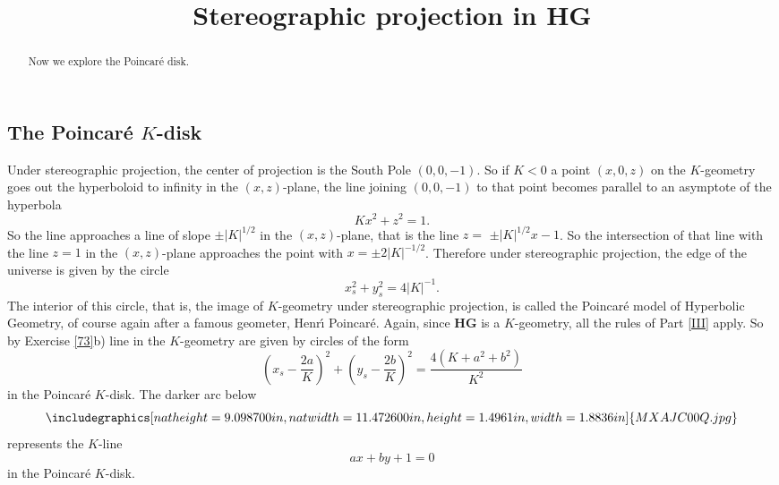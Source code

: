 \documentclass{ximera}
\title{Stereographic projection in HG}
\begin{document}
\begin{abstract}
Now we explore the Poincar\'e disk.
\end{abstract}
\maketitle

\subsection*{The Poincar\'{e} $K$-disk}

Under stereographic projection, the center of projection is the South Pole
$\left(  0,0,-1\right)  $. So if $K<0$ a point $\left(  x,0,z\right)  $ on the
$K$-geometry goes out the hyperboloid to infinity in the $\left(  x,z\right)
$-plane, the line joining $\left(  0,0,-1\right)  $ to that point becomes
parallel to an asymptote of the hyperbola%
\[
Kx^{2}+z^{2}=1.
\]
So the line approaches a line of slope $\pm\left\vert K\right\vert ^{1/2}$ in
the $\left(  x,z\right)  $-plane, that is the line $z=$ $\pm\left\vert
K\right\vert ^{1/2}x-1$. So the intersection of that line with the line $z=1$
in the $\left(  x,z\right)  $-plane approaches the point with $x=\pm
2\left\vert K\right\vert ^{-1/2}$. Therefore under stereographic projection,
the edge of the universe is given by the circle%
\[
x_{s}^{2}+y_{s}^{2}=4\left\vert K\right\vert ^{-1}.
\]
The interior of this circle, that is, the image of $K$-geometry under
stereographic projection, is called the Poincar\'{e} model of Hyperbolic
Geometry, of course again after a famous geometer, Henr\'{\i} Poincar\'{e}.
Again, since \textbf{HG} is a $K$-geometry, all the rules of Part \ref{III}
apply. So by Exercise \ref{73}b) line in the $K$-geometry are given by circles
of the form%
\[
\left(  x_{s}-\frac{2a}{K}\right)  ^{2}+\left(  y_{s}-\frac{2b}{K}\right)
^{2}=\frac{4\left(  K+a^{2}+b^{2}\right)  }{K^{2}}%
\]
in the Poincar\'{e} $K$-disk. The darker arc below%
\begin{equation}%
{\includegraphics[
natheight=9.098700in,
natwidth=11.472600in,
height=1.4961in,
width=1.8836in
]%
{MXAJC00Q.jpg}%
}%
\label{92}%
\end{equation}
represents the $K$-line%
\[
ax+by+1=0
\]
in the Poincar\'{e} $K$-disk. 
\end{document}
